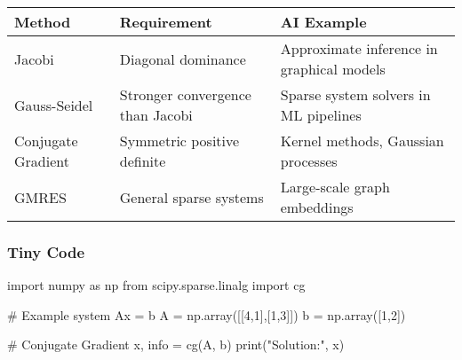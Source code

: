 \documentclass[
  letterpaper,
  DIV=11,
  numbers=noendperiod]{scrreprt}
\newenvironment{Shaded}{\begin{snugshade}}{\end{snugshade}}
\newcommand{\BuiltInTok}[1]{\textcolor[rgb]{0.00,0.23,0.31}{#1}}
\newcommand{\CommentTok}[1]{\textcolor[rgb]{0.37,0.37,0.37}{#1}}
\newcommand{\DecValTok}[1]{\textcolor[rgb]{0.68,0.00,0.00}{#1}}
\newcommand{\ImportTok}[1]{\textcolor[rgb]{0.00,0.46,0.62}{#1}}
\newcommand{\NormalTok}[1]{\textcolor[rgb]{0.00,0.23,0.31}{#1}}
\newcommand{\OperatorTok}[1]{\textcolor[rgb]{0.37,0.37,0.37}{#1}}
\newcommand{\StringTok}[1]{\textcolor[rgb]{0.13,0.47,0.30}{#1}}
\begin{document}
\begin{longtable}[]{@{}
  >{\raggedright\arraybackslash}p{}
  >{\raggedright\arraybackslash}p{}
  >{\raggedright\arraybackslash}p{}@{}}
\toprule\noalign{}
\begin{minipage}[b]{\linewidth}\raggedright
Method
\end{minipage} & \begin{minipage}[b]{\linewidth}\raggedright
Requirement
\end{minipage} & \begin{minipage}[b]{\linewidth}\raggedright
AI Example
\end{minipage} \\
\midrule\noalign{}
\endhead
\bottomrule\noalign{}
\endlastfoot
Jacobi & Diagonal dominance & Approximate inference in graphical
models \\
Gauss-Seidel & Stronger convergence than Jacobi & Sparse system solvers
in ML pipelines \\
Conjugate Gradient & Symmetric positive definite & Kernel methods,
Gaussian processes \\
GMRES & General sparse systems & Large-scale graph embeddings \\
\end{longtable}

\subsubsection{Tiny Code}\label{tiny-code-153}

\begin{Shaded}
\begin{Highlighting}[]
\ImportTok{import}\NormalTok{ numpy }\ImportTok{as}\NormalTok{ np}
\ImportTok{from}\NormalTok{ scipy.sparse.linalg }\ImportTok{import}\NormalTok{ cg}

\CommentTok{\# Example system Ax = b}
\NormalTok{A }\OperatorTok{=}\NormalTok{ np.array([[}\DecValTok{4}\NormalTok{,}\DecValTok{1}\NormalTok{],[}\DecValTok{1}\NormalTok{,}\DecValTok{3}\NormalTok{]])}
\NormalTok{b }\OperatorTok{=}\NormalTok{ np.array([}\DecValTok{1}\NormalTok{,}\DecValTok{2}\NormalTok{])}

\CommentTok{\# Conjugate Gradient}
\NormalTok{x, info }\OperatorTok{=}\NormalTok{ cg(A, b)}
\BuiltInTok{print}\NormalTok{(}\StringTok{"Solution:"}\NormalTok{, x)}
\end{Highlighting}
\end{Shaded}
\end{document}

